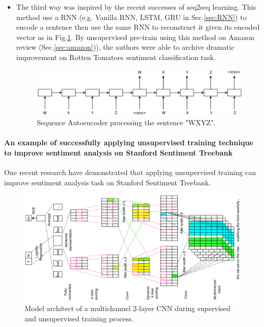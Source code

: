 \begin{itemize}
\item The third way was inspired by the recent successes of seq2seq learning\cite{SutskeverVL14}\cite{semisup-seq2seq}. 
This method use a RNN (e.g. Vanilla RNN, LSTM, GRU in Sec.\ref{sec:RNN}) to encode a sentence then use the same RNN to reconstruct it given its encoded vector\cite{semisup-seq2seq} as in Fig.\ref{fig:rnn-autoencoder}.
By unsupervised pre-train using this method on Amazon review (Sec.\ref{sec:amazon})), the authors were able to archive dramatic improvement on Rotten Tomatoes sentiment classification task. 

\begin{figure}[H]
	\centering	\includegraphics[scale=0.43]{figure/rnn-autoencoder}
	\caption{Sequence Autoencoder processing the sentence "WXYZ"\cite{semisup-seq2seq}.}
	\label{fig:rnn-autoencoder}
\end{figure}

\end{itemize}

\paragraph{An example of successfully applying unsupervised training technique to improve sentiment analysis on Stanford Sentiment Treebank}
One recent research\cite{2-layer-cnn} have demonstrated that applying unsupervised training can improve sentiment analysis task on Stanford Sentiment Treebank.

\begin{figure}
	\centering	\includegraphics[scale=0.5, angle =-90 ]{figure/2-layer-cnn}
	\caption{Model architect of a multichannel 2-layer CNN during supervised and unsupervised training process\cite{2-layer-cnn}.}
	\label{fig:2-layer-cnn}
\end{figure}

